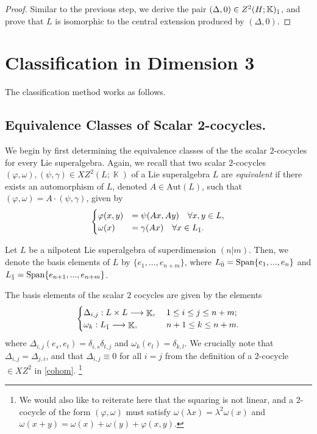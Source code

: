\documentclass[12pt]{amsart}
\DeclareMathOperator{\K}{\mathbb{K}}
\begin{document}
\begin{proof}
Similar to the previous step, we derive the pair $(\Delta,0) \in Z^2(H;\mathbb{K})_{{\bar1}}$, and prove that $L$ is isomorphic to the central extension produced by $(\Delta,0)$. 
\end{proof}

\section{Classification in Dimension 3} The classification method works as follows. 

\subsection{Equivalence Classes of Scalar 2-cocycles.}\label{method}We begin by first determining the equivalence classes of the the scalar $2$-cocycles for every Lie superalgebra. Again, we recall that two scalar $2$-cocycles $(\varphi,\omega),(\psi,\gamma)\in XZ^2(L;\K)$ of a Lie superalgebra $L$ are \emph{equivalent} if there exists an automorphism of $L$, denoted $A\in \text{Aut}(L)$, such that $(\varphi,\omega) = A \cdot (\psi,\gamma)$, given by
\begin{equation}
\begin{cases}\label{conditions}
\varphi(x,y) &= \psi(Ax,Ay) \quad \forall x,y \in L,\\
\omega(x) & =\gamma(Ax) \quad \forall x\in L_{{\bar1}}.
\end{cases}
\end{equation}

Let $L$ be  a nilpotent Lie superalgebra of superdimension $(n|m)$. Then, we denote the basis elements of $L$ by $\{e_1,...,e_{n+m}\}$, where $L_{{\bar0}}= \text{Span}\{e_1,...,e_n\}$ and $L_{{\bar1}}= \text{Span}\{e_{n+1},...,e_{n+m}\}$.

The basis elements of the scalar $2$ cocycles are given by the elements
\begin{equation*}
\begin{cases}
\Delta_{i,j}:L\times L\longrightarrow \K, &~1\leq i \leq   j\leq n+m;\\
\omega_{k}: L_{\od}\longrightarrow\K, &~n+1\leq k \leq n+m. 
\end{cases}
\end{equation*}
where $\Delta_{i,j}(e_s,e_t)=\delta_{i,s}\delta_{t,j}$ and $\omega_{k}(e_l)=\delta_{k,l}$. We crucially note that $\Delta_{i,j}=\Delta_{j,i}$, and that $\Delta_{i,j}\equiv0$ for all $i=j$ from the definition of a $2$-cocycle $\in XZ^2$ in \ref{cohom}. \footnote{We would also like to reiterate here that the squaring is not linear, and a $2$-cocycle of the form $(\varphi,\omega)$ must satisfy $\omega (\lambda x)= \lambda^2 \omega  (x)$ and $\omega(x+y)=\omega(x)+\omega(y)+\varphi(x,y)$.}
\end{document}
